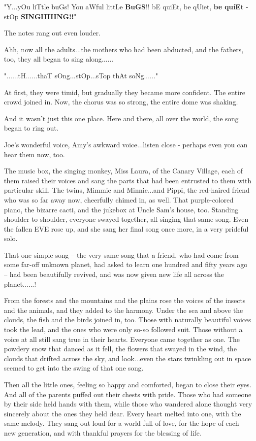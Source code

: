 \documentclass[
]{article}
\begin{document}
"Y...yOu liTtle buGs! You aWful littLe \textbf{BuGS}!! bE quiEt, be
qUiet, \textbf{be quiEt} - stOp \textbf{SINGIIIIING!!}"

The notes rang out even louder.

Ahh, now all the adults...the mothers who had been abducted, and the
fathers, too, they all began to sing along......

"......tH......thaT sOng...stOp...sTop thAt soNg......"

At first, they were timid, but gradually they became more confident. The
entire crowd joined in. Now, the chorus was so strong, the entire dome
was shaking.

And it wasn't just this one place. Here and there, all over the world,
the song began to ring out.

Joe's wonderful voice, Amy's awkward voice...listen close - perhaps even
you can hear them now, too.

The music box, the singing monkey, Miss Laura, of the Canary Village,
each of them raised their voices and sang the parts that had been
entrusted to them with particular skill. The twins, Mimmie and
Minnie...and Pippi, the red-haired friend who was so far away now,
cheerfully chimed in, as well. That purple-colored piano, the bizarre
cacti, and the jukebox at Uncle Sam's house, too. Standing
shoulder-to-shoulder, everyone swayed together, all singing that same
song. Even the fallen EVE rose up, and she sang her final song once
more, in a very prideful solo.

That one simple song -- the very same song that a friend, who had come
from some far-off unknown planet, had asked to learn one hundred and
fifty years ago -- had been beautifully revived, and was now given new
life all across the planet......!

From the forests and the mountains and the plains rose the voices of the
insects and the animals, and they added to the harmony. Under the sea
and above the clouds, the fish and the birds joined in, too. Those with
naturally beautiful voices took the lead, and the ones who were only
so-so followed suit. Those without a voice at all still sang true in
their hearts. Everyone came together as one. The powdery snow that
danced as it fell, the flowers that swayed in the wind, the clouds that
drifted across the sky, and look...even the stars twinkling out in space
seemed to get into the swing of that one song.

Then all the little ones, feeling so happy and comforted, began to close
their eyes. And all of the parents puffed out their chests with pride.
Those who had someone by their side held hands with them, while those
who wandered alone thought very sincerely about the ones they held dear.
Every heart melted into one, with the same melody. They sang out loud
for a world full of love, for the hope of each new generation, and with
thankful prayers for the blessing of life.
\end{document}
